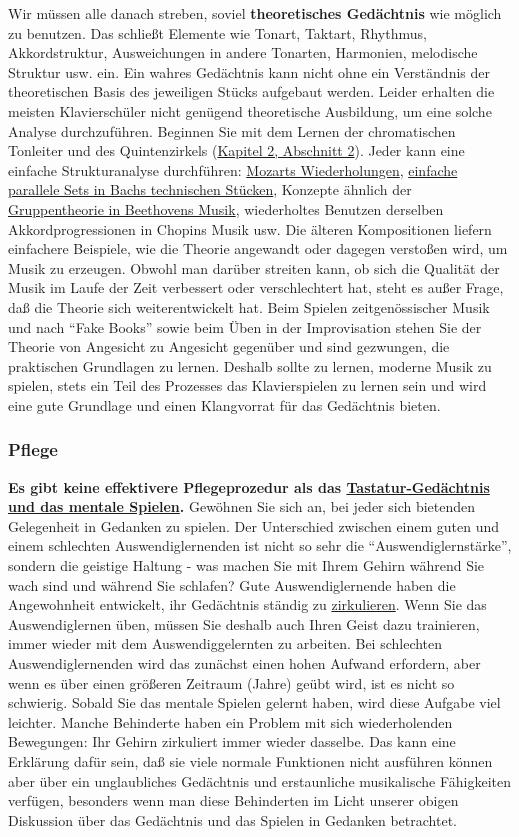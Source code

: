 Wir müssen alle danach streben, soviel \textbf{theoretisches Gedächtnis} wie möglich zu benutzen.
Das schließt Elemente wie Tonart, Taktart, Rhythmus, Akkordstruktur, Ausweichungen in andere Tonarten, Harmonien, melodische Struktur usw. ein.
Ein wahres Gedächtnis kann nicht ohne ein Verständnis der theoretischen Basis des jeweiligen Stücks aufgebaut werden. 
Leider erhalten die meisten Klavierschüler nicht genügend theoretische Ausbildung, um eine solche Analyse durchzuführen.
Beginnen Sie mit dem Lernen der chromatischen Tonleiter und des Quintenzirkels (\hyperref[c2_2]{Kapitel 2, Abschnitt 2}).
Jeder kann eine einfache Strukturanalyse durchführen: \hyperref[c1iv4]{Mozarts Wiederholungen}, \hyperref[c1iii20]{einfache parallele Sets in Bachs technischen Stücken}, Konzepte ähnlich der \hyperref[c1iv4Gruppe]{Gruppentheorie in Beethovens Musik}, wiederholtes Benutzen derselben Akkordprogressionen in Chopins Musik usw.
Die älteren Kompositionen liefern einfachere Beispiele, wie die Theorie angewandt oder dagegen verstoßen wird, um Musik zu erzeugen.
Obwohl man darüber streiten kann, ob sich die Qualität der Musik im Laufe der Zeit verbessert oder verschlechtert hat, steht es außer Frage, daß die Theorie sich weiterentwickelt hat.
Beim Spielen zeitgenössischer Musik und nach \enquote{Fake Books} sowie beim Üben in der Improvisation stehen Sie der Theorie von Angesicht zu Angesicht gegenüber und sind gezwungen, die praktischen Grundlagen zu lernen.
Deshalb sollte zu lernen, moderne Musik zu spielen, stets ein Teil des Prozesses das Klavierspielen zu lernen sein und wird eine gute Grundlage und einen Klangvorrat für das Gedächtnis bieten.


\subsubsection{Pflege}
\label{c1iii6k}

\textbf{Es gibt keine effektivere Pflegeprozedur als das \hyperref[c1iii6tastatur]{Tastatur-Gedächtnis und das mentale Spielen}.}
Gewöhnen Sie sich an, bei jeder sich bietenden Gelegenheit in Gedanken zu spielen.
Der Unterschied zwischen einem guten und einem schlechten Auswendiglernenden ist nicht so sehr die \enquote{Auswendiglernstärke}, sondern die geistige Haltung - was machen Sie mit Ihrem Gehirn während Sie wach sind und während Sie schlafen?
Gute Auswendiglernende haben die Angewohnheit entwickelt, ihr Gedächtnis ständig zu \hyperref[c1iii2]{zirkulieren}.
Wenn Sie das Auswendiglernen üben, müssen Sie deshalb auch Ihren Geist dazu trainieren, immer wieder mit dem Auswendiggelernten zu arbeiten.
Bei schlechten Auswendiglernenden wird das zunächst einen hohen Aufwand erfordern, aber wenn es über einen größeren Zeitraum (Jahre) geübt wird, ist es nicht so schwierig.
Sobald Sie das mentale Spielen gelernt haben, wird diese Aufgabe viel leichter.
Manche Behinderte haben ein Problem mit sich wiederholenden Bewegungen: Ihr Gehirn zirkuliert immer wieder dasselbe.
Das kann eine Erklärung dafür sein, daß sie viele normale Funktionen nicht ausführen können aber über ein unglaubliches Gedächtnis und erstaunliche musikalische Fähigkeiten verfügen, besonders wenn man diese Behinderten im Licht unserer obigen Diskussion über das Gedächtnis und das Spielen in Gedanken betrachtet.

